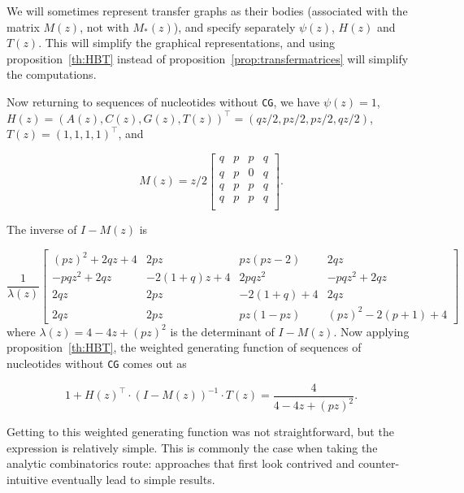 \documentclass{article}
\begin{document}
We will sometimes represent transfer graphs as their bodies (associated
with the matrix $M(z)$, not with $M_*(z)$), and specify separately
$\psi(z)$, $H(z)$ and $T(z)$. This will simplify the graphical
representations, and using proposition~\ref{th:HBT} instead of
proposition~\ref{prop:transfermatrices} will simplify the computations.

Now returning to sequences of nucleotides without \texttt{CG}, we have
$\psi(z) = 1$, $H(z) = (A(z),C(z),G(z),T(z))^\top =
(qz/2,pz/2,pz/2,qz/2)$, $T(z) = (1,1,1,1)^\top$, and

\begin{equation*}
M(z) = z/2
\begin{bmatrix}
q & p & p & q \\
q & p & 0 & q \\
q & p & p & q \\
q & p & p & q \\
\end{bmatrix}.
\end{equation*}

The inverse of $I-M(z)$ is

\begin{equation*}
\frac{1}{\lambda(z)} \left[
\begin{matrix}
(pz)^2+2qz+4   & 2pz        & pz(pz-2)   & 2qz                \\
-pqz^2+2qz     & -2(1+q)z+4 & 2pqz^2     & -pqz^2+2qz         \\
2qz            & 2pz        & -2(1+q)+4  & 2qz                \\
2qz            & 2pz        & pz(1-pz)   & (pz)^2 - 2(p+1) +4
\end{matrix}
\right]
\end{equation*}
where $\lambda(z) = 4 - 4z + (pz)^2$ is the determinant of $I-M(z)$. Now
applying proposition~\ref{th:HBT}, the weighted generating function of
sequences of nucleotides without \texttt{CG} comes out as

\begin{equation}
\label{eq:WGFnoCG}
1 + H(z)^\top \cdot (I-M(z))^{-1} \cdot T(z) = 
\frac{4}{4-4z+(pz)^2}.
\end{equation}

Getting to this weighted generating function was not straightforward, but
the expression is relatively simple. This is commonly the case when taking
the analytic combinatorics route: approaches that first look contrived and
counter-intuitive eventually lead to simple results.
\end{document}
